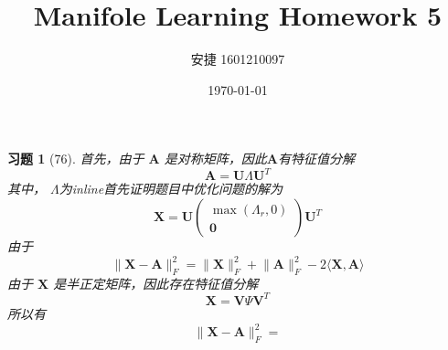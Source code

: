 \documentclass[a4paper, UTF8]{ctexart}
\title{Manifole Learning Homework 5}
\date{\today}
\author{安捷 1601210097}
\newtheorem*{exercise}{\textbf{习题}}
\begin{document}
\maketitle
  \begin{exercise}[76]
    首先，由于 $\mathbf{A}$ 是对称矩阵，因此$\mathbf{A}$有特征值分解
    \begin{equation}
      \mathbf{A} = \mathbf{U} \Lambda \mathbf{U}^T
    \end{equation}
    其中， $\Lambda$为inline首先证明题目中优化问题的解为
    \begin{equation}
      \mathbf{X} = \mathbf{U}
      \left( \begin{array}{c}
        \max \left( \Lambda_r, 0 \right) \\
        \mathbf{0}
      \end{array} \right)
      \mathbf{U}^T
    \end{equation}
    由于
    \begin{equation}
      \lVert \mathbf{X} - \mathbf{A} \rVert_F^2 = \lVert \mathbf{X} \rVert_F^2 + \lVert \mathbf{A} \rVert_F^2 - 2 \langle \mathbf{X}, \mathbf{A}\rangle
    \end{equation}
    由于 $\mathbf{X}$ 是半正定矩阵，因此存在特征值分解
    \begin{equation}
      \mathbf{X}=\mathbf{V} \Psi \mathbf{V}^T
    \end{equation}
    所以有
    \begin{equation}
      \lVert \mathbf{X} - \mathbf{A} \rVert_F^2 =
    \end{equation}
  \end{exercise}
\end{document}
